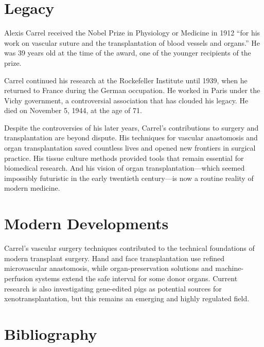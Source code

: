 \section{Legacy}

Alexis Carrel received the Nobel Prize in Physiology or Medicine in 1912 ``for his work on vascular suture and the transplantation of blood vessels and organs.'' He was 39 years old at the time of the award, one of the younger recipients of the prize.

Carrel continued his research at the Rockefeller Institute until 1939, when he returned to France during the German occupation. He worked in Paris under the Vichy government, a controversial association that has clouded his legacy. He died on November 5, 1944, at the age of 71.

Despite the controversies of his later years, Carrel's contributions to surgery and transplantation are beyond dispute. His techniques for vascular anastomosis and organ transplantation saved countless lives and opened new frontiers in surgical practice. His tissue culture methods provided tools that remain essential for biomedical research. And his vision of organ transplantation---which seemed impossibly futuristic in the early twentieth century---is now a routine reality of modern medicine.


\section{Modern Developments}

Carrel's vascular surgery techniques contributed to the technical foundations of modern transplant surgery. Hand and face transplantation use refined microvascular anastomosis, while organ-preservation solutions and machine-perfusion systems extend the safe interval for some donor organs. Current research is also investigating gene-edited pigs as potential sources for xenotransplantation, but this remains an emerging and highly regulated field.


\section{Bibliography}


